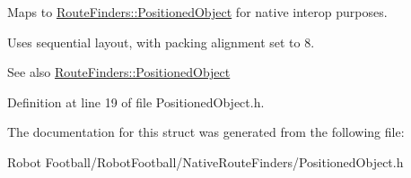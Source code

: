 Maps to \hyperlink{struct_route_finders_1_1_positioned_object}{Route\-Finders\-::\-Positioned\-Object} for native interop purposes.

Uses sequential layout, with packing alignment set to 8.

\begin{DoxySeeAlso}{See also}
\hyperlink{struct_route_finders_1_1_positioned_object}{Route\-Finders\-::\-Positioned\-Object} 
\end{DoxySeeAlso}


Definition at line 19 of file Positioned\-Object.\-h.



The documentation for this struct was generated from the following file\-:\begin{DoxyCompactItemize}
\item 
Robot Football/\-Robot\-Football/\-Native\-Route\-Finders/Positioned\-Object.\-h\end{DoxyCompactItemize}
